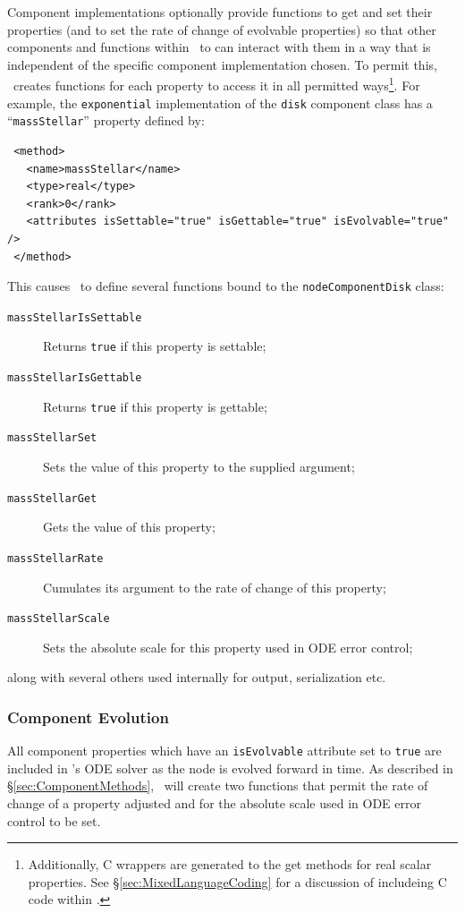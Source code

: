 Component implementations optionally provide functions to get and set their properties (and to set the rate of change of evolvable properties) so that other components and functions within \glc\ to can interact with them in a way that is independent of the specific component implementation chosen. To permit this, \glc\ creates functions for each property to access it in all permitted ways\footnote{Additionally, C wrappers are generated to the get methods for real scalar properties. See \S\protect\ref{sec:MixedLanguageCoding} for a discussion of includeing C code within \protect\glc.}. For example, the {\tt exponential} implementation of the {\tt disk} component class has a ``{\tt massStellar}'' property defined by:
\begin{verbatim}
 <method>
   <name>massStellar</name>
   <type>real</type>
   <rank>0</rank>
   <attributes isSettable="true" isGettable="true" isEvolvable="true" />
 </method>
\end{verbatim}
This causes \glc\ to define several functions bound to the {\tt nodeComponentDisk} class:
\begin{description}
\item [{\tt massStellarIsSettable}] Returns {\tt true} if this property is settable;
\item [{\tt massStellarIsGettable}] Returns {\tt true} if this property is gettable;
\item [{\tt massStellarSet}] Sets the value of this property to the supplied argument;
\item [{\tt massStellarGet}] Gets the value of this property;
\item [{\tt massStellarRate}] Cumulates its argument to the rate of change of this property;
\item [{\tt massStellarScale}] Sets the absolute scale for this property used in ODE error control;
\end{description}
along with several others used internally for output, serialization etc.

\subsubsection{Component Evolution}\label{sec:ComponentEvolution}

All component properties which have an {\tt isEvolvable} attribute set to {\tt true} are included in \glc's ODE solver as the node is evolved forward in time. As described in \S\ref{sec:ComponentMethods}, \glc\ will create two functions that permit the rate of change of a property adjusted and for the absolute scale used in ODE error control to be set.

